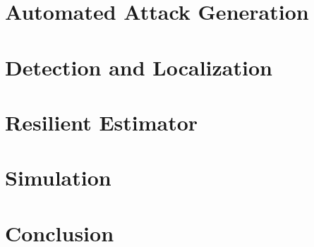 \documentclass[journal]{IEEEtran}
\begin{document}
\section{Automated Attack Generation}\label{sec:attack_generation}


\section{Detection and Localization}\label{sec:detection_localization}


\section{Resilient Estimator}\label{sec:resilient_estimator}


\section{Simulation}\label{sec:simulation}


\section{Conclusion} \label{sec:conclusion}

 

%
\end{document}
